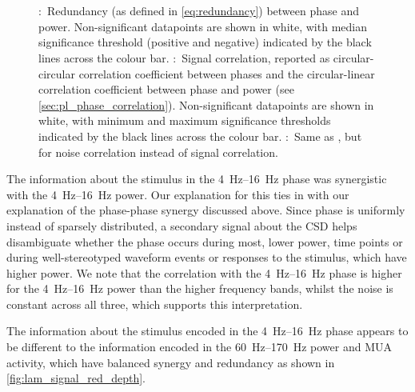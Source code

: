 \begin{figure}[htbp]
\centering
{}
\\
\\
\caption{
\protect{}:~Redundancy (as defined in \autoref{eq:redundancy}) between phase and power.
Non-significant datapoints are shown in white, with median significance threshold (positive and negative) indicated by the black lines across the colour bar.
\protect{}:~Signal correlation, reported as circular-circular correlation coefficient between phases and the circular-linear correlation coefficient between phase and power (see \autoref{sec:pl_phase_correlation}).
Non-significant datapoints are shown in white, with minimum and maximum significance thresholds indicated by the black lines across the colour bar.
\protect{}:~Same as \protect{}, but for noise correlation instead of signal correlation.
}
\label{fig:lam_noisesignal_corr_depth}
\end{figure}


The information about the stimulus in the \SIrange{4}{16}{Hz} phase was synergistic with the \SIrange{4}{16}{Hz} power.
Our explanation for this ties in with our explanation of the phase-phase synergy discussed above.
Since phase is uniformly instead of sparsely distributed, a secondary signal about the \ac{CSD} helps disambiguate whether the phase occurs during most, lower power, time points or during well-stereotyped waveform events or responses to the stimulus, which have higher power.
We note that the correlation with the \SIrange{4}{16}{Hz} phase is higher for the \SIrange{4}{16}{Hz} power than the higher frequency bands, whilst the noise is constant across all three, which supports this interpretation.

The information about the stimulus encoded in the \SIrange{4}{16}{Hz} phase appears to be different to the information encoded in the \SIrange{60}{170}{Hz} power and \ac{MUA} activity, which have balanced synergy and redundancy as shown in \autoref{fig:lam_signal_red_depth}.


